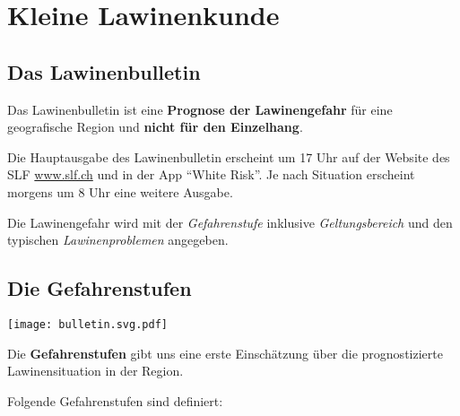 \section{Kleine Lawinenkunde}

\subsection{Das Lawinenbulletin}

Das Lawinenbulletin ist eine \textbf{Prognose der Lawinengefahr} für eine geografische Region und \textbf{nicht für den Einzelhang}.

Die Hauptausgabe des Lawinenbulletin erscheint um 17 Uhr auf der Website des SLF \href{https://www.slf.ch}{www.slf.ch} und in der App \enquote{White Risk}.
Je nach Situation erscheint morgens um 8 Uhr eine weitere Ausgabe.

Die Lawinengefahr wird mit der \textit{Gefahrenstufe} inklusive \textit{Geltungsbereich} und den typischen \textit{Lawinenproblemen} angegeben.

\subsection{Die Gefahrenstufen}

\begin{center}
  \texttt{[image: bulletin.svg.pdf]}
\end{center}

Die \textbf{Gefahrenstufen} gibt uns eine erste Einschätzung über die prognostizierte Lawinensituation in der Region.

\newcolumn

Folgende Gefahrenstufen sind definiert:


